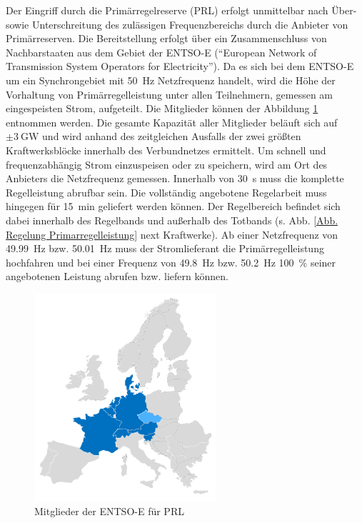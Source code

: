 			Der Eingriff durch die Primärregelreserve (PRL) erfolgt unmittelbar nach Über- sowie Unterschreitung des zulässigen Frequenzbereichs durch die Anbieter von Primärreserven.
			Die Bereitstellung erfolgt über ein Zusammenschluss von Nachbarstaaten aus dem Gebiet der ENTSO-E ("`European Network of Transmission System Operators for Electricity"').
			Da es sich bei dem ENTSO-E um ein Synchrongebiet mit \SI{50}{\hertz} Netzfrequenz handelt, wird die Höhe der Vorhaltung von Primärregelleistung unter allen Teilnehmern, gemessen am eingespeisten Strom, aufgeteilt.
			Die Mitglieder können der Abbildung \ref{Abb. Mitglieder ENTSO-E} entnommen werden.
			Die gesamte Kapazität aller Mitglieder beläuft sich auf $\pm\SI{3}{\giga\watt}$ und wird anhand des zeitgleichen Ausfalls der zwei größten Kraftwerksblöcke innerhalb des Verbundnetzes ermittelt.
			Um schnell und frequenzabhängig Strom einzuspeisen oder zu speichern, wird am Ort des Anbieters die Netzfrequenz gemessen. 
			Innerhalb von \SI{30}{\second} muss die komplette Regelleistung abrufbar sein.
			Die vollständig angebotene Regelarbeit muss hingegen für \SI{15}{\minute} geliefert werden können.
			Der Regelbereich befindet sich dabei innerhalb des Regelbands und außerhalb des Totbands (s. Abb. \ref{Abb. Regelung Primarregelleistung} next Kraftwerke).
			Ab einer Netzfrequenz von \SI{49,99}{\hertz} bzw. \SI{50,01}{\hertz} muss der Stromlieferant die Primärregelleistung hochfahren und bei einer Frequenz von \SI{49,8}{\hertz} bzw. \SI{50,2}{\hertz} \SI{100}{\percent} seiner angebotenen Leistung abrufen bzw. liefern können. 
			
			\begin{figure}[H]
				\centering
				\includegraphics[page=1,trim=70 70 70 120, clip, width=0.6\textwidth]{./anhang/frc-map.png}
				\caption{Mitglieder der ENTSO-E für PRL\parencite{ENTSO-E_PRL}}
				\label{Abb. Mitglieder ENTSO-E}
			\end{figure}
		\clearpage
			
